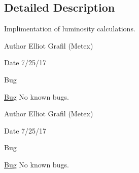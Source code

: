 \subsection{Detailed Description}
Implimentation of luminosity calculations. 

\begin{DoxyAuthor}{Author}
Elliot Grafil (Metex) 
\end{DoxyAuthor}
\begin{DoxyDate}{Date}
7/25/17 
\end{DoxyDate}
\begin{DoxyRefDesc}{Bug}
\item[\hyperlink{bug__bug000006}{Bug}]No known bugs. \end{DoxyRefDesc}


\begin{DoxyAuthor}{Author}
Elliot Grafil (Metex) 
\end{DoxyAuthor}
\begin{DoxyDate}{Date}
7/25/17 
\end{DoxyDate}
\begin{DoxyRefDesc}{Bug}
\item[\hyperlink{bug__bug000008}{Bug}]No known bugs. \end{DoxyRefDesc}

